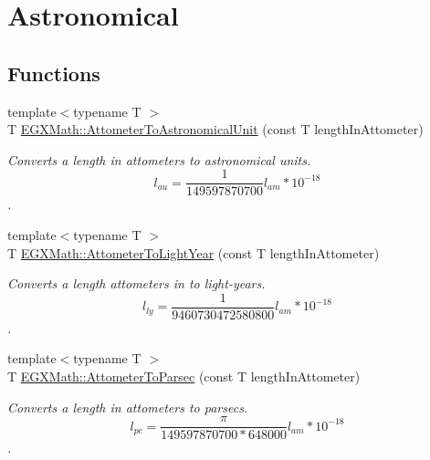 \hypertarget{group___e_g_x_math-_conversions-_length_conversions-_s_i-_attometer-_astronomical}{}\section{Astronomical}
\label{group___e_g_x_math-_conversions-_length_conversions-_s_i-_attometer-_astronomical}
\subsection*{Functions}
\begin{DoxyCompactItemize}
\item 
{\footnotesize template$<$typename T $>$ }\\T \mbox{\hyperlink{group___e_g_x_math-_conversions-_length_conversions-_s_i-_attometer-_astronomical_ga194198d78186434768016c930eae1933}{E\+G\+X\+Math\+::\+Attometer\+To\+Astronomical\+Unit}} (const T length\+In\+Attometer)
\begin{DoxyCompactList}\small\item\em Converts a length in attometers to astronomical units. \[ l_{au}= \frac{1}{149597870700} l_{am} * 10^{-18}\]. \end{DoxyCompactList}\item 
{\footnotesize template$<$typename T $>$ }\\T \mbox{\hyperlink{group___e_g_x_math-_conversions-_length_conversions-_s_i-_attometer-_astronomical_gaca916475a6757e4eb793a7f09bbf46b1}{E\+G\+X\+Math\+::\+Attometer\+To\+Light\+Year}} (const T length\+In\+Attometer)
\begin{DoxyCompactList}\small\item\em Converts a length attometers in to light-\/years. \[ l_{ly}= \frac{1}{9460730472580800} l_{am} * 10^{-18} \]. \end{DoxyCompactList}\item 
{\footnotesize template$<$typename T $>$ }\\T \mbox{\hyperlink{group___e_g_x_math-_conversions-_length_conversions-_s_i-_attometer-_astronomical_ga2f4a0e26e97c60a8f37a1f813d158f48}{E\+G\+X\+Math\+::\+Attometer\+To\+Parsec}} (const T length\+In\+Attometer)
\begin{DoxyCompactList}\small\item\em Converts a length in attometers to parsecs. \[ l_{pc}=\frac{\pi}{149597870700 * 648000} l_{am} * 10^{-18} \]. \end{DoxyCompactList}\end{DoxyCompactItemize}


